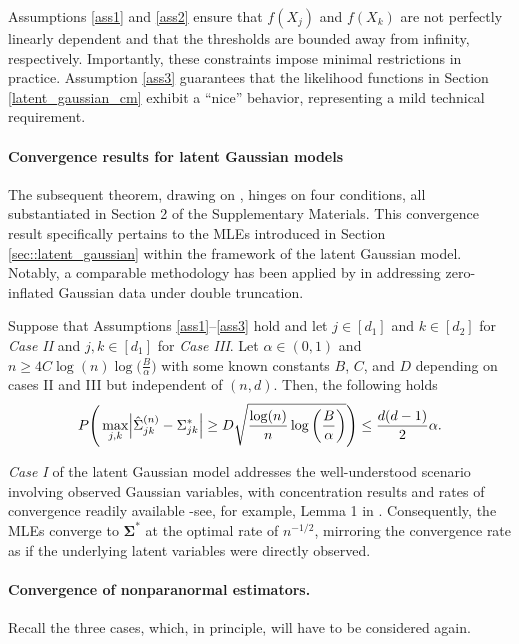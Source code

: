Assumptions \ref{ass1} and \ref{ass2} ensure that $f(X_j)$ and $f(X_k)$ are not perfectly linearly dependent and that the thresholds are bounded away from infinity, respectively. Importantly, these constraints impose minimal restrictions in practice. Assumption \ref{ass3} guarantees that the likelihood functions in Section \ref{latent_gaussian_cm} exhibit a ``nice'' behavior, representing a mild technical requirement.

\paragraph{Convergence results for latent Gaussian  models}
The subsequent theorem, drawing on \citet{Mei18}, hinges on four conditions, all substantiated in Section 2 of the Supplementary Materials. This convergence result specifically pertains to the MLEs introduced in Section \ref{sec::latent_gaussian} within the framework of the latent Gaussian model. Notably, a comparable methodology has been applied by \citet{Anne19} in addressing zero-inflated Gaussian data under double truncation.

\begin{theorem}\label{uniform_convergence}
    Suppose that Assumptions \ref{ass1}--\ref{ass3} hold and let $j \in [d_1]$ and $k \in [d_2]$ for  \textit{Case II} and $j,k \in [d_1]$ for \textit{Case III}. Let $\alpha \in (0,1)$ and \(n \geq 4 C \log(n) \log\Big(\frac{B}{\alpha}\Big)\) with some known constants $B$, $C$, and $D$ depending on cases II and III but independent of $(n,d)$. Then, the following holds
    \begin{equation}
        P\Bigg(\max_{j,k}\abs{\hat{\Sigma}_{jk}^{(n)} - \Sigma_{jk}^{*}} \geq D\sqrt{\frac{\log(n)}{n} \log\bigg(\frac{B}{\alpha}\bigg)}\Bigg) \leq \frac{d(d-1)}{2}\alpha.
    \end{equation}
\end{theorem}
\textit{Case I} of the latent Gaussian model addresses the well-understood scenario involving observed Gaussian variables, with concentration results and rates of convergence readily available -see, for example, Lemma 1 in \citet{Ravikumar11}. Consequently, the MLEs converge to \(\mathbf{\Sigma}^{*}\) at the optimal rate of \(n^{-1/2}\), mirroring the convergence rate as if the underlying latent variables were directly observed.

\paragraph{Convergence of nonparanormal estimators.} Recall the three cases, which, in principle, will have to be considered again.

